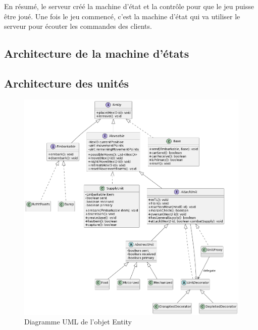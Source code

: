 En résumé, le serveur créé la machine d'état et la contrôle pour que le jeu puisse être joué. Une fois le jeu commencé, c'est la machine d'état qui va utiliser le serveur pour écouter les commandes des clients.


\subsection{Architecture de la machine d'états}
\label{machine_d_etat}



\subsection{Architecture des unités}

\begin{figure}[H]
    \centering
    \includegraphics[scale=0.3]{data/uml_entityV4.png}
    \caption{Diagramme UML de l'objet Entity}
    \label{fig:uml_entity}
\end{figure}

